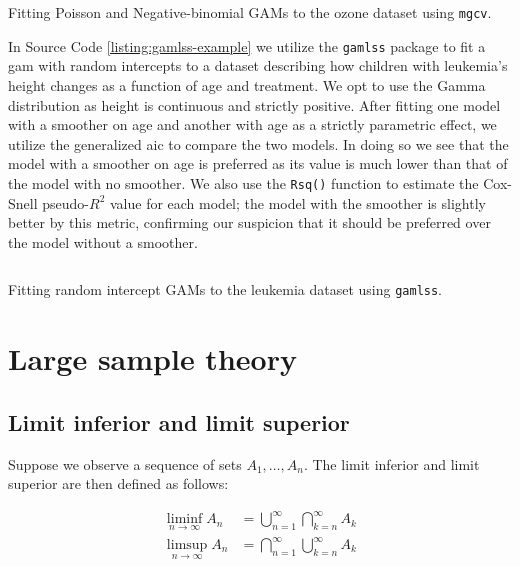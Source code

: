 \documentclass{report}
\begin{document}
\begin{listing}[h!]
\inputminted{r}{Example-Code/mgcv_count_regression.R}
\caption{Fitting Poisson and Negative-binomial GAMs to the ozone dataset using \texttt{mgcv}.}
\label{listing:mgcv-example}
\end{listing}

In Source Code \ref{listing:gamlss-example} we utilize the \texttt{gamlss} package to fit a \gls{gam} with random intercepts to a dataset describing how children with leukemia's height changes as a function of age and treatment. We opt to use the Gamma distribution as height is continuous and strictly positive. After fitting one model with a smoother on age and another with age as a strictly parametric effect, we utilize the generalized \gls{aic} to compare the two models. In doing so we see that the model with a smoother on age is preferred as its value is much lower than that of the model with no smoother. We also use the \texttt{Rsq()} function to estimate the Cox-Snell pseudo-$R^2$ value for each model; the model with the smoother is slightly better by this metric, confirming our suspicion that it should be preferred over the model without a smoother. 

\begin{listing}[h!]
\inputminted{r}{Example-Code/gamlss_random_effects.R}
\caption{Fitting random intercept GAMs to the leukemia dataset using \texttt{gamlss}.}
\label{listing:gamlss-example}
\end{listing}

\section{Large sample theory}\label{sec:tools-lst}

\subsection{Limit inferior and limit superior}

Suppose we observe a sequence of sets $A_1, \dots, A_n$. The limit inferior and limit superior are then defined as follows:

\begin{equation}\label{eq:lst-lim-inf-and-sup}
    \begin{aligned}
        \liminf_{n\to\infty} A_n &= \bigcup_{n=1}^\infty \bigcap_{k=n}^\infty A_k \\
        \limsup_{n \to\infty} A_n &= \bigcap_{n=1}^\infty \bigcup_{k=n}^\infty A_k \\
    \end{aligned}
\end{equation}
\end{document}
